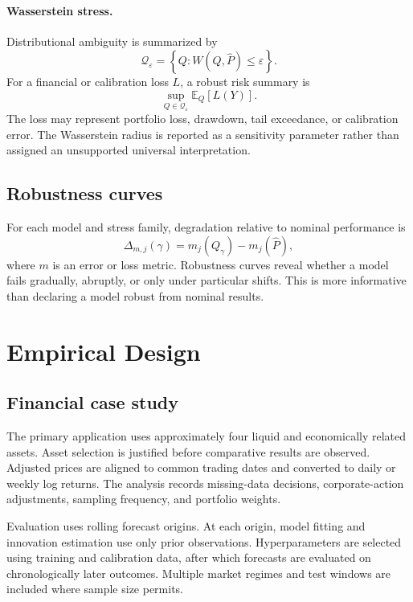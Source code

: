 \documentclass[11pt]{article}
\newcommand{\Phat}{\widehat{P}}
\begin{document}
\paragraph{Wasserstein stress.}
Distributional ambiguity is summarized by
\begin{equation}
    \mathcal{Q}_{\varepsilon}
    =\left\{Q:W(Q,\Phat)\leq\varepsilon\right\}.
\end{equation}
For a financial or calibration loss $L$, a robust risk summary is
\begin{equation}
    \sup_{Q\in\mathcal{Q}_{\varepsilon}}
    \mathbb{E}_{Q}[L(Y)].
\end{equation}
The loss may represent portfolio loss, drawdown, tail exceedance, or calibration error. The Wasserstein radius is reported as a sensitivity parameter rather than assigned an unsupported universal interpretation.

\subsection{Robustness curves}

For each model and stress family, degradation relative to nominal performance is
\begin{equation}
    \Delta_{m,j}(\gamma)
    =m_j(Q_{\gamma})-m_j(\Phat),
\end{equation}
where $m$ is an error or loss metric. Robustness curves reveal whether a model fails gradually, abruptly, or only under particular shifts. This is more informative than declaring a model robust from nominal results.

\section{Empirical Design}

\subsection{Financial case study}

The primary application uses approximately four liquid and economically related assets. Asset selection is justified before comparative results are observed. Adjusted prices are aligned to common trading dates and converted to daily or weekly log returns. The analysis records missing-data decisions, corporate-action adjustments, sampling frequency, and portfolio weights.

Evaluation uses rolling forecast origins. At each origin, model fitting and innovation estimation use only prior observations. Hyperparameters are selected using training and calibration data, after which forecasts are evaluated on chronologically later outcomes. Multiple market regimes and test windows are included where sample size permits.
\end{document}
